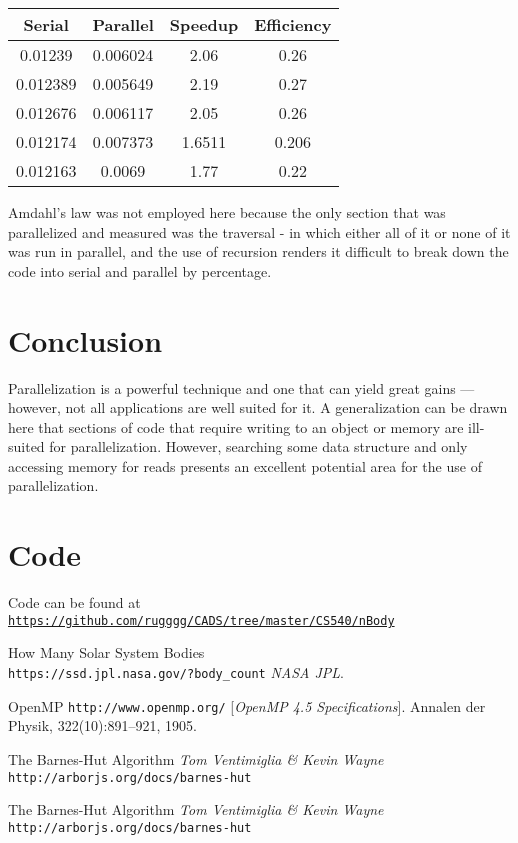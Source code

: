 \documentclass[11pt]{article}
\begin{document}
\begin{table}[!htbp]
\centering
\begin{tabular}{|c|c|c|c|}
\hline
	Serial & Parallel & Speedup & Efficiency\\
\hline
	  0.01239 & 0.006024 & 2.06 & 0.26\\
\hline
	0.012389 & 0.005649 & 2.19 & 0.27\\
\hline
	0.012676 &  0.006117 & 2.05 & 0.26\\
\hline
	 0.012174 & 0.007373 & 1.6511 & 0.206\\
\hline
	0.012163 & 0.0069 & 1.77 & 0.22\\
\hline
\end{tabular}
\end{table}

Amdahl's law was not employed here because the only section that was parallelized and measured was the traversal - in which either all of it or none of it was run in parallel, and the use of recursion renders it difficult to break down the code into serial and parallel by percentage.


\section{Conclusion}
Parallelization is a powerful technique and one that can yield great gains --- however, not all applications are well suited for it. A generalization can be drawn here that sections of code that require writing to an object or memory are ill-suited for parallelization. However, searching some data structure and only accessing memory for reads presents an excellent potential area for the use of parallelization. 

\section{Code}

Code can be found at \texttt{\href{https://github.com/rugggg/CADS/tree/master/CS540/nBody}{https://github.com/rugggg/CADS/tree/master/CS540/nBody}}

\begin{thebibliography}{9}
How Many Solar System Bodies
\\\texttt{https://ssd.jpl.nasa.gov/?body\_count}
\textit{NASA JPL}. 
 
OpenMP
\texttt{http://www.openmp.org/}
[\textit{OpenMP 4.5 Specifications}]. 
Annalen der Physik, 322(10):891–921, 1905.
 
The Barnes-Hut Algorithm
\textit{Tom Ventimiglia \& Kevin Wayne}
\\\texttt{http://arborjs.org/docs/barnes-hut}

The Barnes-Hut Algorithm
\textit{Tom Ventimiglia \& Kevin Wayne}
\\\texttt{http://arborjs.org/docs/barnes-hut}
\end{thebibliography}
\end{document}
